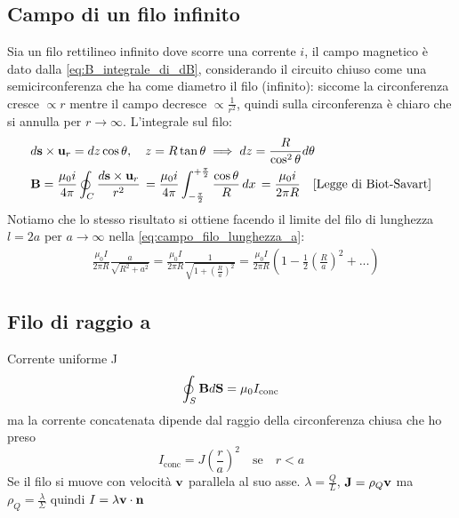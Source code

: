 \subsection{Campo di un filo infinito} \label{section: B filo infinito}
Sia un filo rettilineo infinito dove scorre una corrente $ i $, il campo magnetico è dato dalla \eqref{eq:B_integrale_di_dB}, considerando il circuito 
chiuso come una semicirconferenza che ha come diametro il filo (infinito): siccome la circonferenza cresce $ \propto r $ mentre il campo 
decresce $ \propto \frac{1}{r^2} $, quindi sulla circonferenza è chiaro che si annulla per $ r \to \infty $.
L'integrale sul filo:
\begin{align}
  & d\mathbf{ s }\times\mathbf{ u }_r = dz\cos\theta, \quad z = R \tan\theta \implies dz = \frac{R}{\cos^2\theta}d\theta \\
  &\mathbf{B} =  \frac{\mu_\text{0} i}{4\pi} \oint_C \frac{d\mathbf{s}\times\mathbf{u}_r}{r^2} \, 
  = \frac{\mu_\text{0} i}{4\pi} \int_{-\frac{\pi}{2}}^{+\frac{\pi}{2}} \frac{\cos\theta}{R}\,dx
  \, = \frac{\mu_0 i}{2\pi R}\quad \text{[Legge di Biot-Savart]} \label{eq:Biot-Savart}
\end{align}
Notiamo che lo stesso risultato si ottiene facendo il limite del filo di lunghezza $ l = 2a $ per $ a \to \infty $ nella \eqref{eq:campo_filo_lunghezza_a}:
\begin{align}
  &\frac{\mu_0 I}{2\pi R} \frac{a}{\sqrt{R^2 + a^2}} = \frac{\mu_0 I}{2\pi R} \frac{1}{\sqrt{1 + \left( \frac{R}{a} \right) ^2 }} 
  = \frac{\mu_0 I}{2\pi R} \left( 1 - \frac{1}{2} \left( \frac{R}{a} \right) ^2 + ... \right)
\end{align}

\subsection{Filo di raggio a}
Corrente uniforme J
\begin{equation}
  \oint_S \mathbf{ B } d\mathbf{ S } = \mu_0 I_{\text{conc}}
\end{equation}
ma la corrente concatenata dipende dal raggio della circonferenza chiusa che ho preso
\begin{equation}
  I_{\text{conc}} = J \left(  \frac{r}{a} \right)^2 \quad \text{se}\quad r<a
\end{equation}
Se il filo si muove con velocità $ \mathbf{ v } $ parallela al suo asse.
$ \lambda = \frac{Q}{L} $, $ \mathbf{ J } = \rho_Q \mathbf{ v }$ ma $ \rho_Q = \frac{\lambda}{\Sigma} $
quindi $ I = \lambda \mathbf{ v }\cdot \mathbf{ n } $

